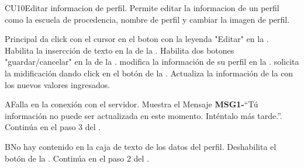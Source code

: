 
	\begin{UseCase}{CU10}{Editar informacion de perfil.}{
		Permite editar la informacion de un perfil como la escuela de procedencia, nombre de perfil y cambiar la imagen de perfil.
	}
		
	\end{UseCase}

	\begin{UCtrayectoria}{Principal}
		\UCpaso[\UCactor] da click con el cursor en el boton con la leyenda "Editar" en la .
		\UCpaso Habilita la insercción de texto en la  de la  .
		\UCpaso Habilita dos botones "guardar/cancelar" en la  de la .
		\UCpaso[\UCactor] modifica la información de su perfil en la .
		\UCpaso[\UCactor] solicita la midificación dando click en el botón  de la  .
		\UCpaso Actualiza la información de la  con los nuevos valores ingresados.
		
	\end{UCtrayectoria}
		\begin{UCtrayectoriaA}{A}{Falla en la conexión con el servidor.}
			\UCpaso Muestra el Mensaje {\bf MSG1-}``Tú información no puede ser actualizada en este momento. Inténtalo más tarde.''.
			\UCpaso Continúa en el paso 3 del .
		\end{UCtrayectoriaA}

		\begin{UCtrayectoriaA}{B}{No hay contenido en la caja de texto de los datos del perfil.}
			\UCpaso Deshabilita el botón  de la .
			\UCpaso Continúa en el paso 2 del .
		\end{UCtrayectoriaA}
		
